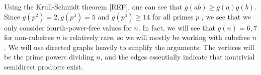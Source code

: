 \documentclass[draft]{article}
\theoremstyle{plain}
\theoremstyle{definition}
\begin{document}
Using the Krull-Schmidt theorem [REF], one can see that $g(ab) \ge g(a)g(b)$. Since $g(p^2) = 2, g(p^3) = 5$ and $g(p^4) \ge 14$ for all primes $p$ {\cite{gnumoas}}, we see that we only consider fourth-power-free values for $n$. In fact, we will see that $g(n) = 6, 7$ for non-cubefree $n$ is relatively rare, so we will mostly be working with cubefree $n$. We will use directed graphs heavily to simplify the arguments: The vertices will be the prime powers dividing $n$, and the edges essentially indicate that nontrivial semidirect products exist.


%
%
%
%
\end{document}
